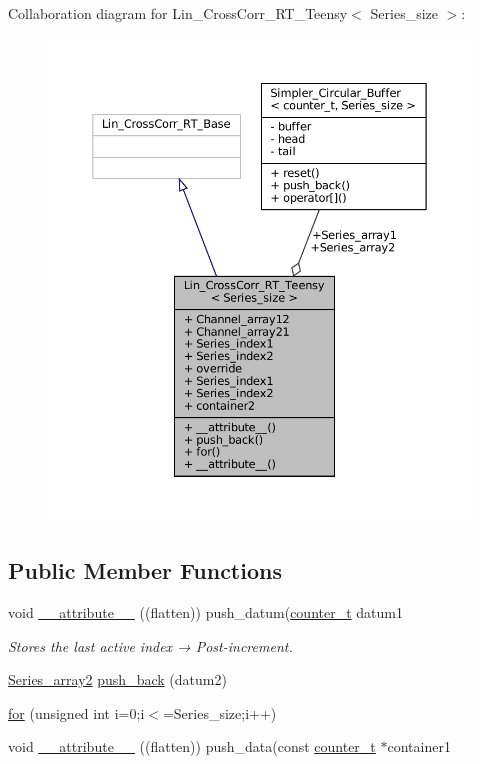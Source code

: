 Collaboration diagram for Lin\+\_\+\+Cross\+Corr\+\_\+\+R\+T\+\_\+\+Teensy$<$ Series\+\_\+size $>$\+:\nopagebreak
\begin{figure}[H]
\begin{center}
\leavevmode
\includegraphics[width=350pt]{d4/d5c/classLin__CrossCorr__RT__Teensy__coll__graph}
\end{center}
\end{figure}
\subsection*{Public Member Functions}
\begin{DoxyCompactItemize}
\item 
void \hyperlink{classLin__CrossCorr__RT__Teensy_a33f639fa3a6f025d5a9ebe60b969cc55}{\+\_\+\+\_\+attribute\+\_\+\+\_\+} ((flatten)) push\+\_\+datum(\hyperlink{types_8hpp_a22f279793847eba127de149437848c48}{counter\+\_\+t} datum1
\begin{DoxyCompactList}\small\item\em Stores the last active index → Post-\/increment. \end{DoxyCompactList}\item 
\hyperlink{classLin__CrossCorr__RT__Teensy_a509bcfdab5a3239a014f5805c388172a}{Series\+\_\+array2} \hyperlink{classLin__CrossCorr__RT__Teensy_af39e68107a612ca22a83046b10f52afb}{push\+\_\+back} (datum2)
\item 
\hyperlink{classLin__CrossCorr__RT__Teensy_aca7ed016d12272211206139cd120b359}{for} (unsigned int i=0;i$<$=Series\+\_\+size;i++)
\item 
void \hyperlink{classLin__CrossCorr__RT__Teensy_a1d3a4042f89c99d3705f50666fa7735c}{\+\_\+\+\_\+attribute\+\_\+\+\_\+} ((flatten)) push\+\_\+data(const \hyperlink{types_8hpp_a22f279793847eba127de149437848c48}{counter\+\_\+t} $\ast$container1
\end{DoxyCompactItemize}
